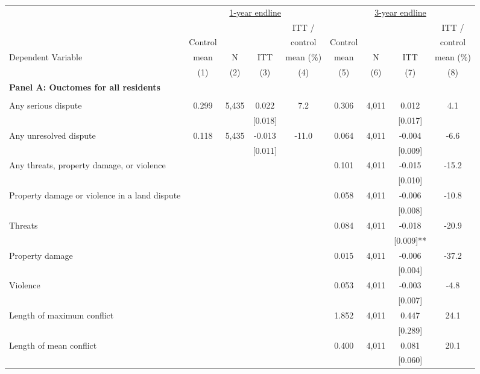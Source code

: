 \begin{tabular}{lcccccccc}
\hline \noalign{\smallskip} & \multicolumn{4}{c}{\uline{\hfill 1-year endline \hfill}} & \multicolumn{4}{c}{\uline{\hfill 3-year endline \hfill}}\\
 &  &  &  & ITT /  &  &  &  & ITT /\\
 & Control &  &  & control & Control &  &  & control\\
Dependent Variable & mean & N & ITT & mean (\%) & mean & N & ITT & mean (\%)\\
 & (1) & (2) & (3) & (4) & (5) & (6) & (7) & (8)\\
\noalign{\smallskip}\hline \noalign{\smallskip}\textbf{Panel A: Ouctomes for all residents} &  &  &  &  &  &  &  & \\
 &  &  &  &  &  &  &  & \\
Any serious dispute & 0.299 & 5,435 & 0.022 & 7.2 & 0.306 & 4,011 & 0.012 & 4.1\\
 &  &  & [0.018] &  &  &  & [0.017] & \\
Any unresolved dispute & 0.118 & 5,435 & -0.013 & -11.0 & 0.064 & 4,011 & -0.004 & -6.6\\
 &  &  & [0.011] &  &  &  & [0.009] & \\
\phantom{} Any threats, property damage, or violence &  &  &  &  & 0.101 & 4,011 & -0.015 & -15.2\\
 &  &  &  &  &  &  & [0.010] & \\
\quad Property damage or violence in a land dispute &  &  &  &  & 0.058 & 4,011 & -0.006 & -10.8\\
 &  &  &  &  &  &  & [0.008] & \\
\quad Threats &  &  &  &  & 0.084 & 4,011 & -0.018 & -20.9\\
 &  &  &  &  &  &  & [0.009]** & \\
\quad Property damage &  &  &  &  & 0.015 & 4,011 & -0.006 & -37.2\\
 &  &  &  &  &  &  & [0.004] & \\
\quad Violence &  &  &  &  & 0.053 & 4,011 & -0.003 & -4.8\\
 &  &  &  &  &  &  & [0.007] & \\
Length of maximum conflict &  &  &  &  & 1.852 & 4,011 & 0.447 & 24.1\\
 &  &  &  &  &  &  & [0.289] & \\
\quad Length of mean conflict &  &  &  &  & 0.400 & 4,011 & 0.081 & 20.1\\
 &  &  &  &  &  &  & [0.060] & \\

\end{tabular}
